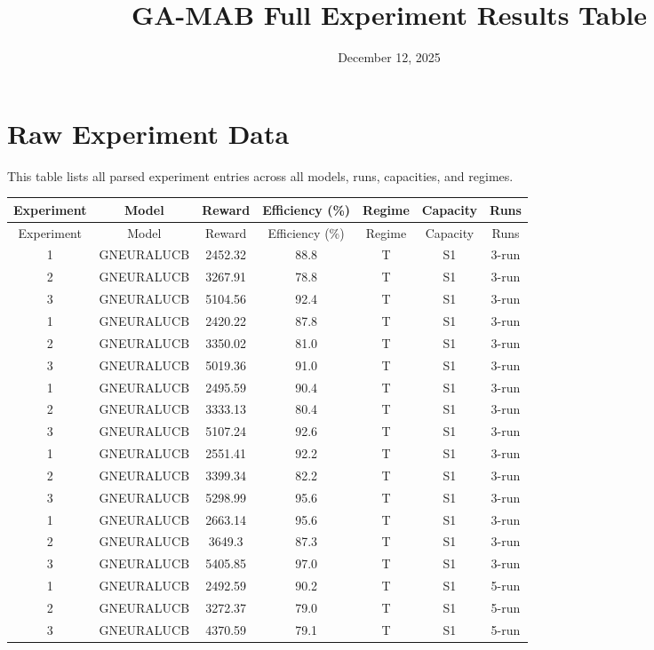 \documentclass[11pt]{article}
\title{GA-MAB Full Experiment Results Table}
\date{December 12, 2025}
\begin{document}
\maketitle

\section*{Raw Experiment Data}
This table lists all parsed experiment entries across all models, runs, capacities, and regimes.

\begin{center}
\scriptsize
\begin{longtable}{|c|c|c|c|c|c|c|}
\hline
Experiment & Model & Reward & Efficiency (\%) & Regime & Capacity & Runs \\\hline
\endfirsthead
\hline
Experiment & Model & Reward & Efficiency (\%) & Regime & Capacity & Runs \\\hline
\hline
\endhead
1 & GNEURALUCB & 2452.32 & 88.8 & T & S1 & 3-run \\
2 & GNEURALUCB & 3267.91 & 78.8 & T & S1 & 3-run \\
3 & GNEURALUCB & 5104.56 & 92.4 & T & S1 & 3-run \\
1 & GNEURALUCB & 2420.22 & 87.8 & T & S1 & 3-run \\
2 & GNEURALUCB & 3350.02 & 81.0 & T & S1 & 3-run \\
3 & GNEURALUCB & 5019.36 & 91.0 & T & S1 & 3-run \\
1 & GNEURALUCB & 2495.59 & 90.4 & T & S1 & 3-run \\
2 & GNEURALUCB & 3333.13 & 80.4 & T & S1 & 3-run \\
3 & GNEURALUCB & 5107.24 & 92.6 & T & S1 & 3-run \\
1 & GNEURALUCB & 2551.41 & 92.2 & T & S1 & 3-run \\
2 & GNEURALUCB & 3399.34 & 82.2 & T & S1 & 3-run \\
3 & GNEURALUCB & 5298.99 & 95.6 & T & S1 & 3-run \\
1 & GNEURALUCB & 2663.14 & 95.6 & T & S1 & 3-run \\
2 & GNEURALUCB & 3649.3 & 87.3 & T & S1 & 3-run \\
3 & GNEURALUCB & 5405.85 & 97.0 & T & S1 & 3-run \\
1 & GNEURALUCB & 2492.59 & 90.2 & T & S1 & 5-run \\
2 & GNEURALUCB & 3272.37 & 79.0 & T & S1 & 5-run \\
3 & GNEURALUCB & 4370.59 & 79.1 & T & S1 & 5-run \\

\end{longtable}
\end{center}
\end{document}

